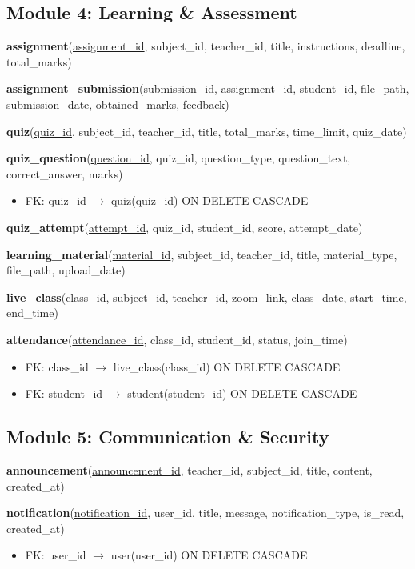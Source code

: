 \documentclass[12pt,a4paper]{report}
\begin{document}
\subsection{Module 4: Learning \& Assessment}

\textbf{assignment}(\underline{assignment\_id}, subject\_id, teacher\_id, title, instructions, deadline, total\_marks)

\textbf{assignment\_submission}(\underline{submission\_id}, assignment\_id, student\_id, file\_path, submission\_date, obtained\_marks, feedback)

\textbf{quiz}(\underline{quiz\_id}, subject\_id, teacher\_id, title, total\_marks, time\_limit, quiz\_date)

\textbf{quiz\_question}(\underline{question\_id}, quiz\_id, question\_type, question\_text, correct\_answer, marks)
\begin{itemize}[noitemsep,topsep=2pt]
    \item FK: quiz\_id $\rightarrow$ quiz(quiz\_id) ON DELETE CASCADE
\end{itemize}

\textbf{quiz\_attempt}(\underline{attempt\_id}, quiz\_id, student\_id, score, attempt\_date)

\textbf{learning\_material}(\underline{material\_id}, subject\_id, teacher\_id, title, material\_type, file\_path, upload\_date)

\textbf{live\_class}(\underline{class\_id}, subject\_id, teacher\_id, zoom\_link, class\_date, start\_time, end\_time)

\textbf{attendance}(\underline{attendance\_id}, class\_id, student\_id, status, join\_time)
\begin{itemize}[noitemsep,topsep=2pt]
    \item FK: class\_id $\rightarrow$ live\_class(class\_id) ON DELETE CASCADE
    \item FK: student\_id $\rightarrow$ student(student\_id) ON DELETE CASCADE
\end{itemize}

\subsection{Module 5: Communication \& Security}

\textbf{announcement}(\underline{announcement\_id}, teacher\_id, subject\_id, title, content, created\_at)

\textbf{notification}(\underline{notification\_id}, user\_id, title, message, notification\_type, is\_read, created\_at)
\begin{itemize}[noitemsep,topsep=2pt]
    \item FK: user\_id $\rightarrow$ user(user\_id) ON DELETE CASCADE
\end{itemize}
\end{document}
